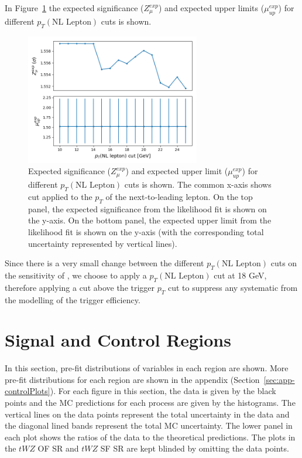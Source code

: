 In Figure~\ref{fig:4lep-NLlep-optimization} the expected significance ($Z_{\mu}^{exp}$) and expected upper limits ($\mu_{up}^{exp}$) for different $p_{T}(\text{NL Lepton})$ cuts is shown.
\begin{figure}[h!]
	\includegraphics[width = 0.68\textwidth]{figures/NL_Lep_optimization.png}
  \centering
	\caption{Expected significance ($Z_{\mu}^{exp}$) and expected upper limit ($\mu_{up}^{exp}$) for different $p_{T}(\text{NL Lepton})$ cuts is shown. The common x-axis shows cut applied to the $p_{T}$ of the next-to-leading lepton. On the top panel, the expected significance from the likelihood fit is shown on the y-axis. On the bottom panel, the expected upper limit from the likelihood fit is shown on the y-axis (with the corresponding total uncertainty represented by vertical lines).}
	\label{fig:4lep-NLlep-optimization}
\end{figure}

Since there is a very small change between the different $p_{T}(\text{NL Lepton})$ cuts on the sensitivity of \tWZ, we choose to apply a $p_{T}(\text{NL Lepton})$ cut at 18 GeV, therefore applying a cut above the trigger $p_{T}$ cut to suppress any systematic from the modelling of the trigger efficiency.

\section{Signal and Control Regions}

In this section, pre-fit distributions of variables in each region are shown. More pre-fit distributions for each region are shown in the appendix (Section~\ref{sec:app-controlPlots}). For each figure in this section, the data is given by the black points and the MC predictions for each process are given by the histograms. The vertical lines on the data points represent the total uncertainty in the data and the diagonal lined bands represent the total MC uncertainty. The lower panel in each plot shows the ratios of the data to the theoretical predictions. The plots in the $tWZ$ OF SR and $tWZ$ SF SR are kept blinded by omitting the data points.\\\\

